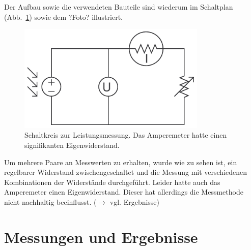 \documentclass[11pt]{scrartcl}
\begin{document}
Der Aufbau sowie die verwendeten Bauteile sind wiederum im Schaltplan (Abb.~\ref{leistungsschaltkreis}) sowie dem ?Foto? illustriert.

\begin{figure}[ht]
\begin{center}
\includegraphics[width=0.8\textwidth]{images/leistungsmesskreis.pdf}
\end{center}
\vspace{-1.5\baselineskip}
\caption{Schaltkreis zur Leistungsmessung. Das Amperemeter hatte einen signifikanten Eigenwiderstand.}
\label{leistungsschaltkreis}
\end{figure}

Um mehrere Paare an Messwerten zu erhalten, wurde wie zu sehen ist, ein regelbarer Widerstand zwischengeschaltet und die Messung mit verschiedenen Kombinationen der Widerst\"ande durchgef\"uhrt. Leider hatte auch das Amperemeter einen Eigenwiderstand. Dieser hat allerdings die Messmethode nicht nachhaltig beeinflusst. ($\rightarrow$ vgl. Ergebnisse) %





\section{Messungen und Ergebnisse}
\end{document}
